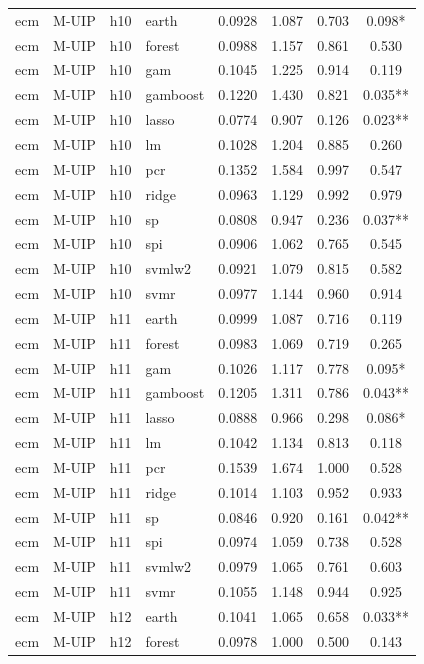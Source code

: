 \begin{ThreePartTable}
\begin{longtable}[t]{llclcccc}
\addlinespace
ecm & M-UIP & h10 & earth & 0.0928 & 1.087 & 0.703 & 0.098*\\
ecm & M-UIP & h10 & forest & 0.0988 & 1.157 & 0.861 & 0.530\\
ecm & M-UIP & h10 & gam & 0.1045 & 1.225 & 0.914 & 0.119\\
ecm & M-UIP & h10 & gamboost & 0.1220 & 1.430 & 0.821 & 0.035**\\
ecm & M-UIP & h10 & lasso & 0.0774 & 0.907 & 0.126 & 0.023**\\
ecm & M-UIP & h10 & lm & 0.1028 & 1.204 & 0.885 & 0.260\\
ecm & M-UIP & h10 & pcr & 0.1352 & 1.584 & 0.997 & 0.547\\
ecm & M-UIP & h10 & ridge & 0.0963 & 1.129 & 0.992 & 0.979\\
ecm & M-UIP & h10 & sp & 0.0808 & 0.947 & 0.236 & 0.037**\\
ecm & M-UIP & h10 & spi & 0.0906 & 1.062 & 0.765 & 0.545\\
ecm & M-UIP & h10 & svmlw2 & 0.0921 & 1.079 & 0.815 & 0.582\\
ecm & M-UIP & h10 & svmr & 0.0977 & 1.144 & 0.960 & 0.914\\
\addlinespace
ecm & M-UIP & h11 & earth & 0.0999 & 1.087 & 0.716 & 0.119\\
ecm & M-UIP & h11 & forest & 0.0983 & 1.069 & 0.719 & 0.265\\
ecm & M-UIP & h11 & gam & 0.1026 & 1.117 & 0.778 & 0.095*\\
ecm & M-UIP & h11 & gamboost & 0.1205 & 1.311 & 0.786 & 0.043**\\
ecm & M-UIP & h11 & lasso & 0.0888 & 0.966 & 0.298 & 0.086*\\
ecm & M-UIP & h11 & lm & 0.1042 & 1.134 & 0.813 & 0.118\\
ecm & M-UIP & h11 & pcr & 0.1539 & 1.674 & 1.000 & 0.528\\
ecm & M-UIP & h11 & ridge & 0.1014 & 1.103 & 0.952 & 0.933\\
ecm & M-UIP & h11 & sp & 0.0846 & 0.920 & 0.161 & 0.042**\\
ecm & M-UIP & h11 & spi & 0.0974 & 1.059 & 0.738 & 0.528\\
ecm & M-UIP & h11 & svmlw2 & 0.0979 & 1.065 & 0.761 & 0.603\\
ecm & M-UIP & h11 & svmr & 0.1055 & 1.148 & 0.944 & 0.925\\
\addlinespace
ecm & M-UIP & h12 & earth & 0.1041 & 1.065 & 0.658 & 0.033**\\
ecm & M-UIP & h12 & forest & 0.0978 & 1.000 & 0.500 & 0.143\\

\end{longtable}
\end{ThreePartTable}
